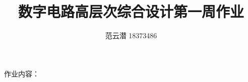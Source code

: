 \documentclass[lang=cn,11pt,a4paper,cite=authoryear]{elegantpaper}
\title{数字电路高层次综合设计\quad 第一周作业}
\author{范云潜 18373486}
\institute{微电子学院 184111 班}
\date{\zhtoday}
\begin{document}
\maketitle

作业内容：

\tableofcontents


\end{document}
